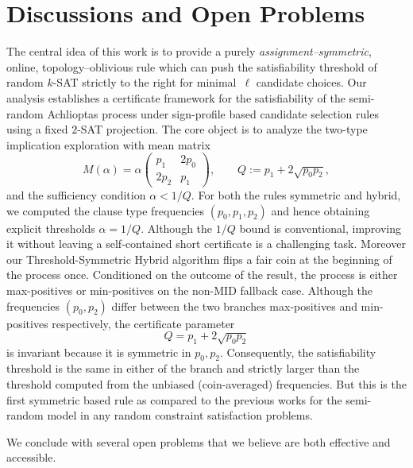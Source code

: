 \documentclass[11pt,reqno]{amsart}
\numberwithin{equation}{section}
\begin{document}
	\section{Discussions and Open Problems}\label{sec:conclusions}
    The central idea of this work is to provide a purely \emph{assignment--symmetric}, online, topology--oblivious rule which can push the satisfiability threshold of random $k$-SAT strictly to the right for minimal~$\ell$ candidate choices.
    Our analysis establishes a certificate framework for the satisfiability of the semi-random Achlioptas process under sign-profile based candidate selection rules using a fixed $2$-SAT projection. 
    The core object is to analyze the two-type implication exploration with mean matrix
    \[
    M(\alpha)=\alpha
    \begin{pmatrix}
    	p_1 & 2p_0\\[2pt]
    	2p_2 & p_1
    \end{pmatrix},\qquad
    Q:=p_1+2\sqrt{p_0p_2},
    \]
    and the sufficiency condition $\alpha<1/Q$. 
    For both the rules symmetric and hybrid, we computed the clause type frequencies $(p_0,p_1,p_2)$ and hence obtaining explicit thresholds $\alpha=1/Q$.  
    Although the $1/Q$ bound is conventional, improving it without leaving a self-contained short certificate is a challenging task.
    Moreover our Threshold-Symmetric Hybrid algorithm flips a fair coin at the beginning of the process once.
    Conditioned on the outcome of the result, the process is either max-positives or min-positives on the non-MID fallback case. 
    Although the frequencies $(p_0,p_2)$ differ between the two branches max-positives and min-positives respectively, the certificate parameter
    \[
    Q=p_1+2\sqrt{p_0p_2}
    \]
    is invariant because it is symmetric in $p_0,p_2$. Consequently, the satisfiability threshold is the same in either of the branch and strictly larger than the threshold computed from the unbiased (coin-averaged) frequencies.
    But this is the first symmetric based rule as compared to the previous works \cite{DDHM,Perkins,SV} for the semi-random model in any random constraint satisfaction problems.
     
    We conclude with several open problems that we believe are both effective and accessible.
    
\end{document}
